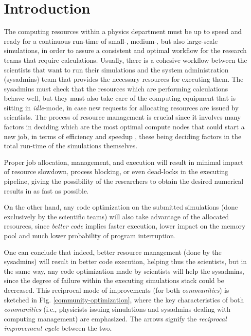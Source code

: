 \documentclass[conference]{IEEEtran}
\begin{document}
\section{Introduction}
\label{section-introduction}
The computing resources within a physics department must be up to speed and ready for a continuous run-time of small-, medium-, but also large-scale simulations, in order to assure a consistent and optimal workflow for the research teams that require calculations. Usually, there is a cohesive workflow between the scientists that want to run their simulations and the system administration (sysadmins) team that provides the necessary resources for executing them. The sysadmins must check that the resources which are performing calculations behave well, but they must also take care of the computing equipment that is sitting in \emph{idle}-mode, in case new requests for allocating resources are issued by scientists. The process of resource management is crucial since it involves many factors in deciding which are the most optimal compute nodes that could start a new job, in terms of efficiency and speedup \cite{paya2015resource}, these being deciding factors in the total run-time of the simulations themselves.
\par Proper job allocation, management, and execution will result in minimal impact of resource slowdown, process blocking, or even dead-locks in the executing pipeline, giving the possibility of the researchers to obtain the desired numerical results in as fast as possible. 
\par On the other hand, any code optimization \cite{codeoptimization2,codeoptimization1} on the submitted simulations (done exclusively by the scientific teams) will also take advantage of the allocated resources, since \emph{better code} implies faster execution, lower impact on the memory pool and much lower probability of program interruption.
\par One can conclude that indeed, better resource management (done by the sysadmins) will result in better code execution, helping thus the scientists, but in the same way, any code optimization made by scientists will help the sysadmins, since the degree of failure within the executing simulations stack could be decreased. This reciprocal-mode of improvements (for both \emph{communities}) is sketched in Fig. \ref{community-optimization}, where the key characteristics of both \emph{communities} (i.e., physicists issuing simulations and sysadmins dealing with computing management) are emphasized. The arrows signify the \emph{reciprocal improvement cycle} between the two.
\end{document}

